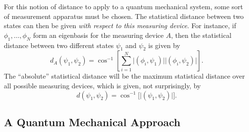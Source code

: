 For this notion of distance to apply to a quantum mechanical system,
some sort of measurement apparatus must be chosen.  The statistical
distance between two states can then be given \emph{with respect to
this measuring device}.  For instance, if $\phi_1,\ldots,\phi_N$ form
an eigenbasis for the measuring device $A$, then the statistical
distance between two different states $\psi_1$ and $\psi_2$ is given
by
\begin{equation}
d_A(\psi_1,\psi_2) = \cos^{-1}\left\lbrack 
    \sum_{i=1}^N
    \bigl| \left(\phi_i,\psi_1 \right) \bigr|
    \bigl| \left(\phi_i,\psi_2 \right) \bigr|
\right\rbrack.
\end{equation}
The ``absolute'' statistical distance will be the maximum statistical
distance over all possible measuring devices, which is given, not
surprisingly, by
\begin{equation}
d(\psi_1,\psi_2) = \cos^{-1}\biggl\lbrack 
    \bigl| \left(\psi_1,\psi_2 \right) \bigr|
\biggr\rbrack.
\end{equation}


\subsection{A Quantum Mechanical Approach}
\label{ssec:qmapproach}


